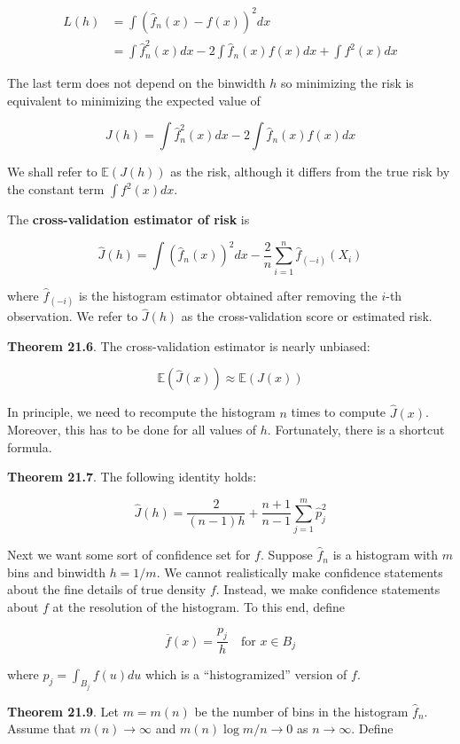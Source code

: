 \[
\begin{align}
L(h) &= \int \left( \hat{f}_n(x) - f(x) \right)^2 dx \\
&= \int \hat{f}_n^2(x) dx - 2 \int \hat{f}_n(x) f(x) dx + \int f^2(x) dx
\end{align}
\]

The last term does not depend on the binwidth \(h\) so minimizing the
risk is equivalent to minimizing the expected value of

\[ J(h) = \int \hat{f}_n^2(x) dx - 2 \int \hat{f}_n(x) f(x) dx \]

We shall refer to \(\mathbb{E}(J(h))\) as the risk, although it differs
from the true risk by the constant term \(\int f^2(x) dx\).

The \textbf{cross-validation estimator of risk} is

\[ \hat{J}(h) = \int \left( \hat{f}_n(x) \right)^2 dx - \frac{2}{n} \sum_{i=1}^n \hat{f}_{(-i)}(X_i)\]

where \(\hat{f}_{(-i)}\) is the histogram estimator obtained after
removing the \(i\)-th observation. We refer to \(\hat{J}(h)\) as the
cross-validation score or estimated risk.

\textbf{Theorem 21.6}. The cross-validation estimator is nearly
unbiased:

\[ \mathbb{E}(\hat{J}(x)) \approx \mathbb{E}(J(x)) \]

In principle, we need to recompute the histogram \(n\) times to compute
\(\hat{J}(x)\). Moreover, this has to be done for all values of \(h\).
Fortunately, there is a shortcut formula.

\textbf{Theorem 21.7}. The following identity holds:

\[ \hat{J}(h) = \frac{2}{(n - 1)h} + \frac{n+1}{n-1} \sum_{j=1}^m \hat{p}_j^2 \]

Next we want some sort of confidence set for \(f\). Suppose
\(\hat{f}_n\) is a histogram with \(m\) bins and binwidth \(h = 1 / m\).
We cannot realistically make confidence statements about the fine
details of true density \(f\). Instead, we make confidence statements
about \(f\) at the resolution of the histogram. To this end, define

\[ \overline{f}(x) = \frac{p_j}{h} \quad \text{for } x \in B_j \]

where \(p_j = \int_{B_j} f(u) du\) which is a ``histogramized'' version
of \(f\).

\textbf{Theorem 21.9}. Let \(m = m(n)\) be the number of bins in the
histogram \(\hat{f}_n\). Assume that \(m(n) \rightarrow \infty\) and
\(m(n) \log m / n \rightarrow 0\) as \(n \rightarrow \infty\). Define

